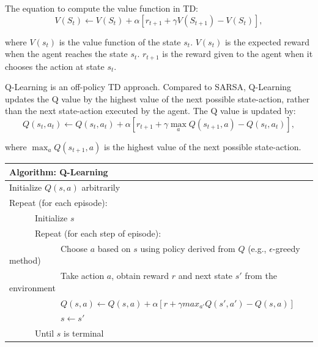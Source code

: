 
The equation to compute the value function in TD:
\begin{displaymath}
   V(S_t) \leftarrow V(S_t) + \alpha [r_{t+1} + \gamma V(S_{t+1}) - V(S_t)],
\end{displaymath}

where $V(s_t)$ is the value function of the state $s_t$. $V(s_t)$ is the expected reward when
the agent reaches the state $s_t$. $r_{t+1}$ is the reward given to the agent when it chooses
the action at state $s_t$.

\label{sec:Q-Learning}
    Q-Learning is an off-policy TD approach. Compared to SARSA, Q-Learning updates
the Q value by the highest value of the next possible state-action, rather than the 
next state-action executed by the agent.  
The Q value is updated by:
\begin{displaymath}
   Q(s_t, a_t) \leftarrow Q(s_t, a_t) + \alpha [r_{t+1}+\gamma \max_a Q(s_{t+1},a)-Q(s_t,a_t)],
\end{displaymath}

where $\max_a Q(s_{t+1},a)$ is the highest value of the next possible state-action. 

\begin{center}
\begin{tabular}{@{}lp{6cm}@{}}
\hline
Algorithm: Q-Learning\\
\hline
Initialize $Q(s, a)$ arbitrarily\\
Repeat (for each episode):\\
\ \ \ \ \ \ Initialize $s$\\
\ \ \ \ \ \ Repeat (for each step of episode):\\
\ \ \ \ \ \ \ \ \ \ \ \ Choose $a$ based on $s$ using policy derived from $Q$ (e.g., $\epsilon$-greedy method)\\
\ \ \ \ \ \ \ \ \ \ \ \ Take action $a$, obtain reward $r$ and next state $s'$ from the environment\\
\ \ \ \ \ \ \ \ \ \ \ \ $Q(s, a) \leftarrow Q(s, a) + \alpha [r + \gamma max_{a'} Q(s', a')-Q(s, a)]$\\
\ \ \ \ \ \ \ \ \ \ \ \ $s \leftarrow s'$\\
\ \ \ \ \ \ Until $s$ is terminal\\
\hline  
\end{tabular}
\end{center}

